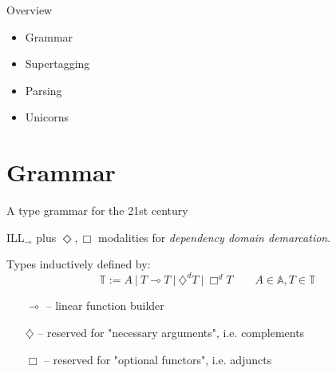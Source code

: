 \documentclass{beamer}
\newcommand{\li}{\multimap}
\begin{document}
\date{\smaller End-to-End Compositional Models of Vector-Based Semantics\\
ESSLLI, August 2022, Galway}

\title{}
\subtitle{\textit{the \textcolor{rp}{u}\textcolor{rp2}{n}\textcolor{rb}{i}\textcolor{rg}{c}\textcolor{ry}{o}\textcolor{ro}{r}\textcolor{rr}{n} of constant-time parsing}}

\author{%
    Konstantinos Kogkalidis\\ 
}


{%
}

\begin{frame}{Overview}
\begin{itemize}
\item Grammar
\item Supertagging
\item Parsing
\item Unicorns
\end{itemize}
\end{frame}

\section{Grammar}

\begin{frame}{A type grammar for the 21st century}
\smaller	

	ILL$_{\li}$ plus $\Diamond, \Box$ modalities for \textit{dependency domain demarcation}.
\vfill
	
Types inductively defined by:
\[
	\mathbb{T} := A \ | \  T \li T \ | \ \diamondsuit^d  T \ | \ \Box^d T \qquad A \in \mathbb{A}, T \in \mathbb{T}
\]
\vfill	

	\begin{itemize}
	\item[$\li$]		-- linear function builder
	\item[$\diamondsuit$] 	-- reserved for "necessary arguments", i.e. complements
	\item[$\Box$]		-- reserved for "optional functors", i.e. adjuncts
\end{itemize}
\end{frame}
\end{document}
